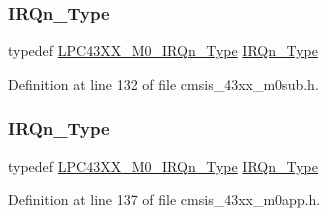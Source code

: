 \subsubsection{\texorpdfstring{I\+R\+Qn\+\_\+\+Type}{IRQn\_Type}\hspace{0.1cm}{\footnotesize\ttfamily [1/2]}}
{\footnotesize\ttfamily typedef \hyperlink{group___c_m_s_i_s__43_x_x___m0___i_r_q_ga402456eb2f4f5b3dc2a53f725eed9485}{L\+P\+C43\+X\+X\+\_\+\+M0\+\_\+\+I\+R\+Qn\+\_\+\+Type} \hyperlink{group___c_m_s_i_s__18_x_x___i_r_q_gaa44deabd252bda567898bae35a086adc}{I\+R\+Qn\+\_\+\+Type}}



Definition at line 132 of file cmsis\+\_\+43xx\+\_\+m0sub.\+h.

\mbox{\label{group___c_m_s_i_s__43_x_x___m0_gaf9da996d1de1fbce33c325fc3c4292da}} 
\subsubsection{\texorpdfstring{I\+R\+Qn\+\_\+\+Type}{IRQn\_Type}\hspace{0.1cm}{\footnotesize\ttfamily [2/2]}}
{\footnotesize\ttfamily typedef \hyperlink{group___c_m_s_i_s__43_x_x___m0___i_r_q_ga402456eb2f4f5b3dc2a53f725eed9485}{L\+P\+C43\+X\+X\+\_\+\+M0\+\_\+\+I\+R\+Qn\+\_\+\+Type} \hyperlink{group___c_m_s_i_s__18_x_x___i_r_q_gaa44deabd252bda567898bae35a086adc}{I\+R\+Qn\+\_\+\+Type}}



Definition at line 137 of file cmsis\+\_\+43xx\+\_\+m0app.\+h.

